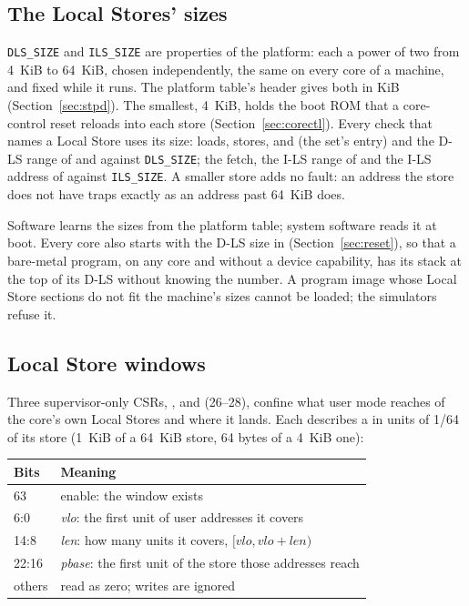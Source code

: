\subsection{The Local Stores' sizes}\label{sec:lssize}
\texttt{DLS\_SIZE} and \texttt{ILS\_SIZE} are properties of the platform: each a power of two from
4~KiB to 64~KiB, chosen independently, the same on every core of a machine, and fixed while it runs.
The platform table's header gives both in KiB (Section~\ref{sec:stpd}). The smallest, 4~KiB, holds the
boot ROM that a core-control reset reloads into each store (Section~\ref{sec:corectl}). Every check that
names a Local Store uses its size: loads, stores,  and  (the set's entry) and
the D-LS range of  and  against \texttt{DLS\_SIZE}; the fetch, the I-LS range of
 and the I-LS address of  against \texttt{ILS\_SIZE}. A smaller store adds no
fault: an address the store does not have traps exactly as an address past 64~KiB does.

Software learns the sizes from the platform table; system software reads it at boot. Every core also
starts with the D-LS size in  (Section~\ref{sec:reset}), so that a bare-metal program, on any
core and without a device capability, has its stack at the top of its D-LS without knowing the number.
A program image whose Local Store sections do not fit the machine's sizes cannot be loaded; the
simulators refuse it.

\subsection{Local Store windows}\label{sec:lswin}
Three supervisor-only CSRs, ,  and  (26--28), confine what user mode
reaches of the core's own Local Stores and where it lands. Each describes a  in units of
1/64 of its store (1~KiB of a 64~KiB store, 64 bytes of a 4~KiB one):

\begin{center}\small
\begin{tabularx}{\linewidth}{@{}l X@{}}
\toprule
\textbf{Bits} & \textbf{Meaning}\\\midrule
63 & enable: the window exists\\
6:0 & \textit{vlo}: the first unit of user addresses it covers\\
14:8 & \textit{len}: how many units it covers, $[\textit{vlo}, \textit{vlo} + \textit{len})$\\
22:16 & \textit{pbase}: the first unit of the store those addresses reach\\
others & read as zero; writes are ignored\\
\bottomrule
\end{tabularx}
\end{center}

